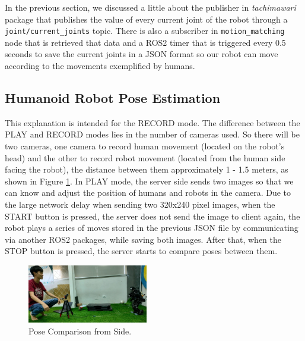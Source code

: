 In the previous section, we discussed a little about the publisher in \emph{tachimawari} package that publishes the value of every current joint of the robot through a \verb|joint/current_joints| topic.
There is also a subscriber in \verb|motion_matching| node that is retrieved that data and a ROS2 timer that is triggered every 0.5 seconds to save the current joints in a JSON format so our robot can move according to the movements exemplified by humans.


\subsection{Humanoid Robot Pose Estimation}
\label{subsec:humanoid-robot-pose-estimation}

This explanation is intended for the RECORD mode. The difference between the PLAY and RECORD modes lies in the number of cameras used.
So there will be two cameras, one camera to record human movement (located on the robot's head) and the other to record robot movement (located from the human side facing the robot), the distance between them approximately 1 - 1.5 meters, as shown in Figure \ref{fig:pose-comparison-side}.
In PLAY mode, the server side sends two images so that we can know and adjust the position of humans and robots in the camera. Due to the large network delay when sending two 320x240 pixel images, when the START button is pressed,
the server does not send the image to client again, the robot plays a series of moves stored in the previous JSON file by communicating via another ROS2 packages, while saving both images. After that, when the STOP button is pressed, the server starts to compare poses between them.
\begin{figure}[ht]
  \centering
  \includegraphics[width=0.47\textwidth]{gambar/pose-comparison.jpeg}
  \caption{Pose Comparison from Side.}
  \label{fig:pose-comparison-side}
\end{figure}

